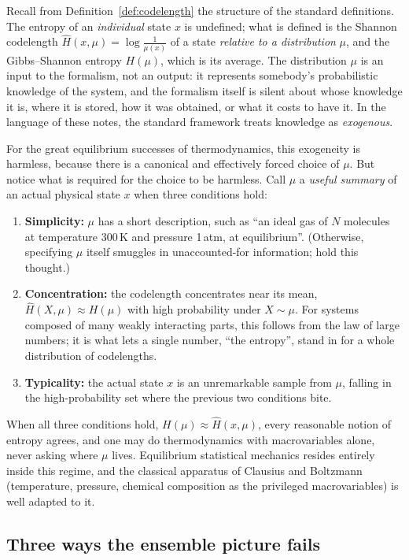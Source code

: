 \documentclass[10pt]{article}
\theoremstyle{definition}
\theoremstyle{remark}
\begin{document}
Recall from Definition~\ref{def:codelength} the structure of the standard definitions. The entropy of an \emph{individual} state $x$ is undefined; what is defined is the Shannon codelength $\hat H(x, \mu) = \log \frac{1}{\mu(x)}$ of a state \emph{relative to a distribution} $\mu$, and the Gibbs--Shannon entropy $H(\mu)$, which is its average. The distribution $\mu$ is an input to the formalism, not an output: it represents somebody's probabilistic knowledge of the system, and the formalism itself is silent about whose knowledge it is, where it is stored, how it was obtained, or what it costs to have it. In the language of these notes, the standard framework treats knowledge as \emph{exogenous}.

For the great equilibrium successes of thermodynamics, this exogeneity is harmless, because there is a canonical and effectively forced choice of $\mu$. But notice what is required for the choice to be harmless. Call $\mu$ a \emph{useful summary} of an actual physical state $x$ when three conditions hold:
\begin{enumerate}[leftmargin=2em]
  \item \textbf{Simplicity:} $\mu$ has a short description, such as ``an ideal gas of $N$ molecules at temperature 300\,K and pressure 1\,atm, at equilibrium''. (Otherwise, specifying $\mu$ itself smuggles in unaccounted-for information; hold this thought.)
  \item \textbf{Concentration:} the codelength concentrates near its mean, $\hat H(X, \mu) \approx H(\mu)$ with high probability under $X \sim \mu$. For systems composed of many weakly interacting parts, this follows from the law of large numbers; it is what lets a single number, ``the entropy'', stand in for a whole distribution of codelengths.
  \item \textbf{Typicality:} the actual state $x$ is an unremarkable sample from $\mu$, falling in the high-probability set where the previous two conditions bite.
\end{enumerate}
When all three conditions hold, $H(\mu) \approx \hat H(x, \mu)$, every reasonable notion of entropy agrees, and one may do thermodynamics with macrovariables alone, never asking where $\mu$ lives. Equilibrium statistical mechanics resides entirely inside this regime, and the classical apparatus of Clausius and Boltzmann (temperature, pressure, chemical composition as the privileged macrovariables) is well adapted to it.

\subsection{Three ways the ensemble picture fails}
\label{sec:failures}
\end{document}
